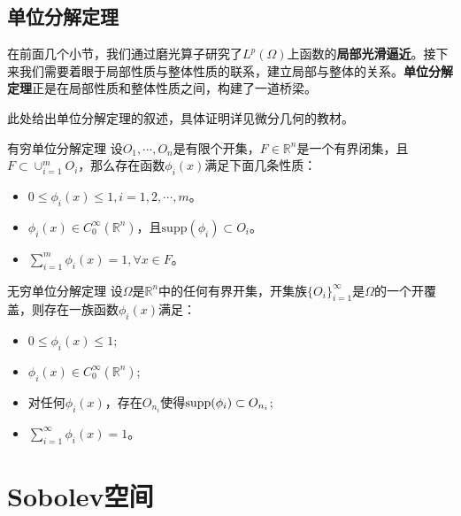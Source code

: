 \subsection{单位分解定理}
在前面几个小节，我们通过磨光算子研究了$L^{p}(\Omega)$上函数的\textbf{局部光滑逼近}。接下来我们需要着眼于局部性质与整体性质的联系，建立局部与整体的关系。\textbf{单位分解定理}正是在局部性质和整体性质之间，构建了一道桥梁。

此处给出单位分解定理的叙述，具体证明详见微分几何的教材。
\begin{theorem}{有穷单位分解定理}
    设$O_{1},\cdots,O_{n}$是有限个开集，$F\in\mathbb{R}^{n}$是一个有界闭集，且$F\subset\cup_{i=1}^{m}O_{i}$，那么存在函数$\phi_{i}(x)$满足下面几条性质：
    \begin{itemize}
        \item $0\le \phi_{i}(x)\le 1,i=1,2,\cdots,m$。
        \item $\phi_{i}(x)\in C_{0}^{\infty}(\mathbb{R}^{n})$，且$\text{supp}(\phi_{i})\subset O_{i}$。
        \item $\sum_{i=1}^{m}\phi_{i}(x)=1,\forall x\in F$。
    \end{itemize}
\end{theorem}
\begin{theorem}{无穷单位分解定理}
    设$\Omega$是$\mathbb{R}^{n}$中的任何有界开集，开集族$\{O_{i}\}_{i=1}^{\infty}$是$\Omega$的一个开覆盖，则存在一族函数$\phi_{i}(x)$满足：
    \begin{itemize}
        \item $0\le\phi_{i}(x)\le 1$;
        \item $\phi_{i}(x)\in C_{0}^{\infty}(\mathbb{R}^{n})$;
        \item 对任何$\phi_{i}(x)$，存在$O_{n_{i}}$使得$\text{supp}(\phi_{i})\subset O_{n_{i}}$;
        \item $\sum_{i=1}^{\infty}\phi_{i}(x)=1$。
    \end{itemize}
\end{theorem}
\section{Sobolev空间}
